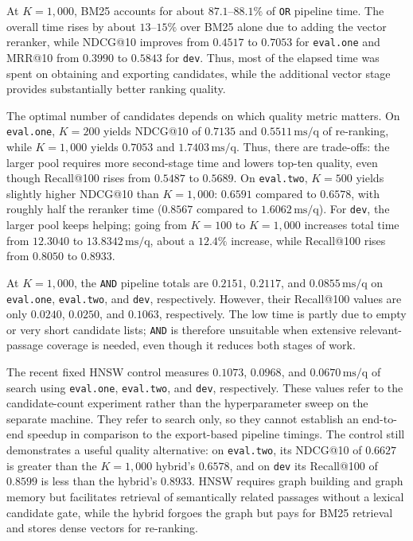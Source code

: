 \documentclass[11pt]{article}
\begin{document}
At $K=1{,}000$, BM25 accounts for about $87.1$--$88.1\%$ of \texttt{OR} pipeline time. The overall time rises by about $13$--$15\%$ over BM25 alone due to adding the vector reranker, while NDCG@10 improves from $0.4517$ to $0.7053$ for \texttt{eval.one} and MRR@10 from $0.3990$ to $0.5843$ for \texttt{dev}. Thus, most of the elapsed time was spent on obtaining and exporting candidates, while the additional vector stage provides substantially better ranking quality.

The optimal number of candidates depends on which quality metric matters. On \texttt{eval.one}, $K=200$ yields NDCG@10 of $0.7135$ and $0.5511\,\text{ms/q}$ of re-ranking, while $K=1{,}000$ yields $0.7053$ and $1.7403\,\text{ms/q}$. Thus, there are trade-offs: the larger pool requires more second-stage time and lowers top-ten quality, even though Recall@100 rises from $0.5487$ to $0.5689$. On \texttt{eval.two}, $K=500$ yields slightly higher NDCG@10 than $K=1{,}000$: $0.6591$ compared to $0.6578$, with roughly half the reranker time ($0.8567$ compared to $1.6062\,\text{ms/q}$). For \texttt{dev}, the larger pool keeps helping; going from $K=100$ to $K=1{,}000$ increases total time from $12.3040$ to $13.8342\,\text{ms/q}$, about a $12.4\%$ increase, while Recall@100 rises from $0.8050$ to $0.8933$.

At $K=1{,}000$, the \texttt{AND} pipeline totals are $0.2151$, $0.2117$, and $0.0855\,\text{ms/q}$ on \texttt{eval.one}, \texttt{eval.two}, and \texttt{dev}, respectively. However, their Recall@100 values are only $0.0240$, $0.0250$, and $0.1063$, respectively. The low time is partly due to empty or very short candidate lists; \texttt{AND} is therefore unsuitable when extensive relevant-passage coverage is needed, even though it reduces both stages of work.

The recent fixed HNSW control measures $0.1073$, $0.0968$, and $0.0670\,\text{ms/q}$ of search using \texttt{eval.one}, \texttt{eval.two}, and \texttt{dev}, respectively. These values refer to the candidate-count experiment rather than the hyperparameter sweep on the separate machine. They refer to search only, so they cannot establish an end-to-end speedup in comparison to the export-based pipeline timings. The control still demonstrates a useful quality alternative: on \texttt{eval.two}, its NDCG@10 of $0.6627$ is greater than the $K=1{,}000$ hybrid's $0.6578$, and on \texttt{dev} its Recall@100 of $0.8599$ is less than the hybrid's $0.8933$. HNSW requires graph building and graph memory but facilitates retrieval of semantically related passages without a lexical candidate gate, while the hybrid forgoes the graph but pays for BM25 retrieval and stores dense vectors for re-ranking.
\end{document}
